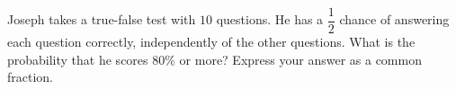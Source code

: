 Joseph takes a true-false test with $10$ questions. He has a $\dfrac12$ chance of answering each question correctly, independently of the other questions. What is the probability that he scores $80\%$ or more? Express your answer as a common fraction.
